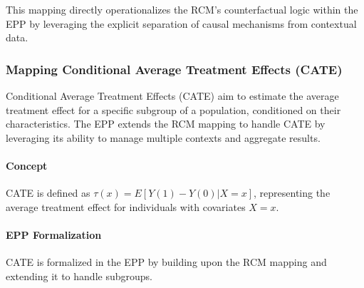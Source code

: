This mapping directly operationalizes the RCM's counterfactual logic within the EPP by leveraging the explicit separation of causal mechanisms from contextual data.


\subsubsection{Mapping Conditional Average Treatment Effects (CATE)}
\label{sec:formalization_mapping_cate}

Conditional Average Treatment Effects (CATE) aim to estimate the average treatment effect for a specific subgroup of 
a population, conditioned on their characteristics. The EPP extends the RCM mapping to handle CATE by leveraging its ability to manage multiple contexts and aggregate results.

\paragraph{Concept}
 CATE is defined as \(\tau(x) = E[Y(1) - Y(0) | X=x]\), representing the average treatment effect for individuals with covariates  \(X=x\).

\paragraph{EPP Formalization}
CATE is formalized in the EPP by building upon the RCM mapping and extending it to handle subgroups.

